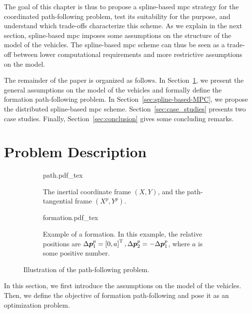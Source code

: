 The goal of this chapter is thus to propose a spline-based \gls{mpc} strategy for the coordinated path-following problem, test its suitability for the purpose, and understand which trade-offs characterize this scheme. As we explain in the next section, spline-based \gls{mpc} imposes some assumptions on the structure of the model of the vehicles.    
The spline-based \gls{mpc} scheme can thus be seen as a trade-off between lower computational requirements and more restrictive assumptions on the model.

The remainder of the paper is organized as follows.
In Section~\ref{sec:problem-description}, we present the general assumptions on the model of the vehicles and formally define the formation path-following problem.
In Section~\ref{sec:spline-based-MPC}, we propose the distributed spline-based \gls{mpc} scheme.
Section~\ref{sec:case_studies} presents two case studies.
Finally, Section~\ref{sec:conclusion} gives some concluding remarks.

\section{Problem Description}
\label{sec:problem-description}

\begin{figure}[b]
    \centering
    \begin{subfigure}[t]{0.24\textwidth}
        \def\svgwidth{\textwidth}
        {path.pdf_tex}
        
        \caption{The inertial coordinate frame $(X,Y)$, and the path-tangential frame $(X^p,Y^p)$.}
        \label{fig:path}
        
    \end{subfigure}
    \begin{subfigure}[t]{0.24\textwidth}
        \def\svgwidth{\textwidth}
        {formation.pdf_tex}
        
        \caption{Example of a formation. In this example, the relative positions are $\Delta\bm{p}_1^p = \left[0, a\right]^{\mathrm{T}}, \Delta\bm{p}_2^p = -\Delta\bm{p}_1^p$, where $a$ is some positive number.}
        \label{fig:formation}
        
    \end{subfigure}
    \caption{Illustration of the path-following problem.}
    \label{fig:path-following}
\end{figure}

In this section, we first introduce the assumptions on the model of the vehicles.
Then, we define the objective of formation path-following and pose it as an optimization problem.



